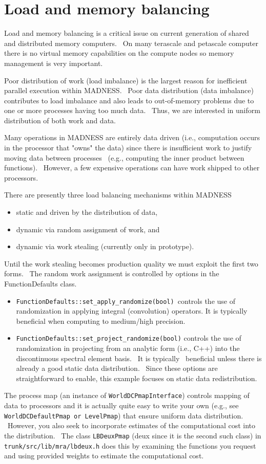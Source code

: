\section{Load and memory balancing}
Load and memory balancing is a critical issue on current generation of shared and distributed memory computers. \ On
many terascale and petascale computer there is no virtual memory capabilities on the compute nodes so memory management
is very important.

Poor distribution of work (load imbalance) is the largest reason for inefficient parallel execution within MADNESS.
\ Poor data distribution (data imbalance) contributes to load imbalance and also leads to out-of-memory problems due to
one or more processes having too much data. \ Thus, we are interested in uniform distribution of both work and data. 

Many operations in MADNESS are entirely data driven (i.e., computation occurs in the processor that
"owns" the data) since there is insufficient work to justify moving data between processes
\ (e.g., computing the inner product between functions). \ However, a few expensive operations can have work shipped to
other processors. 

There are presently three load balancing mechanisms within MADNESS 

\begin{itemize}
\item static and driven by the distribution of data, 
\item dynamic via random assignment of work, and 
\item dynamic via work stealing (currently only in prototype). 
\end{itemize}
Until the work stealing becomes production quality we must exploit the first two forms. \ The random work assignment is
controlled by options in the FunctionDefaults class. 

\begin{itemize}
\item \texttt{FunctionDefaults::set\_apply\_randomize(bool) }controls the use of randomization in applying integral
(convolution) operators. It is typically beneficial when computing to medium/high precision. 
\item \texttt{FunctionDefaults::set\_project\_randomize(bool)} controls the use of randomization in projecting from an
analytic form (i.e., C++) into the discontinuous spectral element basis. \ It is typically \ beneficial unless there is
already a good static data distribution. \ Since these options are straightforward to enable, this example focuses on
static data redistribution. 
\end{itemize}
The process map (an instance of \texttt{WorldDCPmapInterface}) controls mapping of data to processors and it is actually
quite easy to write your own (e.g., see \texttt{WorldDCDefaultPmap }\texttt{or LevelPmap}) that ensure uniform data
distribution. \ However, you also seek to incorporate estimates of the computational cost into the distribution. \ The
class \texttt{LBDeuxPmap} (deux since it is the second such class) in \texttt{trunk/src/lib/mra/lbdeux.h} does this by
examining the functions you request and using provided weights to estimate the computational cost. 

